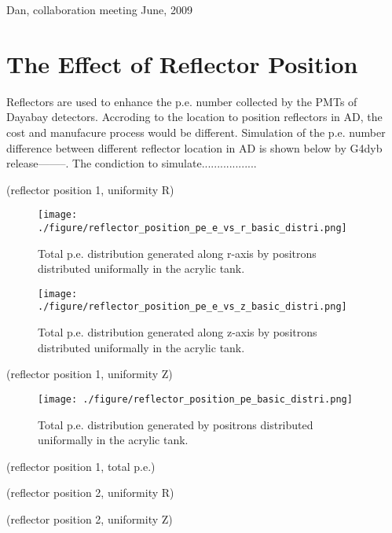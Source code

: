 Dan, collaboration meeting June, 2009


\section {The Effect of Reflector Position}
\label {Reflector}

Reflectors are used to enhance the p.e. number collected by the PMTs of Dayabay
detectors. Accroding to the location to position reflectors in AD, the cost and
manufacure process would be different. Simulation of the p.e. number difference
between different reflector location in AD is shown below by G4dyb release--------.
The condiction to simulate..................


(reflector position 1, uniformity R)

\begin{figure}
    \centering
    \texttt{[image: ./figure/reflector\_position\_pe\_e\_vs\_r\_basic\_distri.png]}
    \caption{Total p.e. distribution generated along r-axis by positrons distributed uniformally in the acrylic tank.}
    \label{fig:reflector_position_pe_e_vs_r_basic_distri.png}
    \end{figure}


\begin{figure}
    \centering
    \texttt{[image: ./figure/reflector\_position\_pe\_e\_vs\_z\_basic\_distri.png]}
    \caption{Total p.e. distribution generated along z-axis by positrons distributed uniformally in the acrylic tank.}
    \label{fig:reflector_position_pe_e_vs_r_basic_distri.png}
    \end{figure}



(reflector position 1, uniformity Z)



\begin{figure}
    \centering
    \texttt{[image: ./figure/reflector\_position\_pe\_basic\_distri.png]}
    \caption{Total p.e. distribution generated by positrons distributed uniformally in the acrylic tank.}
    \label{fig:reflector_position_pe_basic_distri.png}
    \end{figure}



(reflector position 1, total p.e.)




(reflector position 2, uniformity R)




(reflector position 2, uniformity Z)




